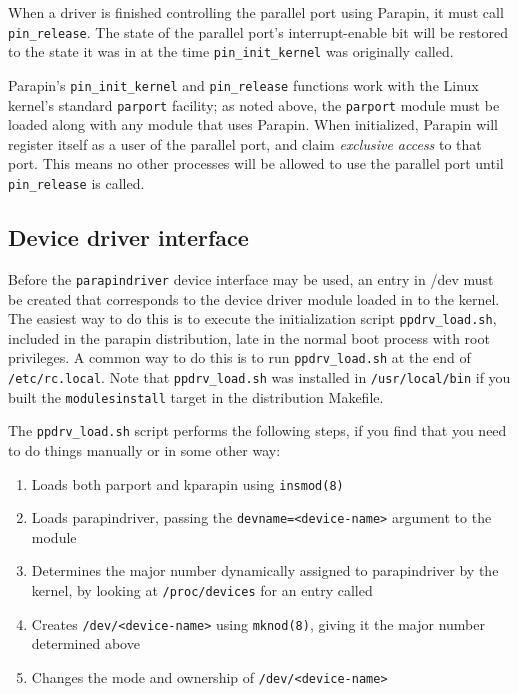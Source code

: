 \documentclass{article}
\begin{document}
When a driver is finished controlling the parallel port using Parapin,
it must call {\tt pin\_release}.  The state of the parallel port's
interrupt-enable bit will be restored to the state it was in at the
time {\tt pin\_init\_kernel} was originally called.

Parapin's {\tt pin\_init\_kernel} and {\tt pin\_release} functions
work with the Linux kernel's standard {\tt parport} facility; as noted
above, the {\tt parport} module must be loaded along with any module
that uses Parapin.  When initialized, Parapin will register itself as
a user of the parallel port, and claim {\em exclusive access} to that
port.  This means no other processes will be allowed to use the
parallel port until {\tt pin\_release} is called.

\subsection{Device driver interface}

Before the {\tt parapindriver} device interface may be used, an
entry in /dev must be created that corresponds to the device driver
module loaded in to the kernel.  The easiest way to do this is to
execute the initialization script {\tt ppdrv\_load.sh}, included in
the parapin distribution, late in the normal
boot process with root privileges.
A common way to do this is to run {\tt ppdrv\_load.sh} at the end of
{\tt /etc/rc.local}.  Note that {\tt ppdrv\_load.sh} was
installed in {\tt /usr/local/bin} if you built the {\tt modulesinstall}
target in the distribution Makefile.

The {\tt ppdrv\_load.sh} script performs the following steps, if you
find that you need to do things manually or in some other way:

\begin{enumerate}
\item Loads both parport and kparapin using {\tt insmod(8)}
\item Loads parapindriver, passing the {\tt devname=<device-name>}
argument to the module
\item Determines the major number dynamically assigned to parapindriver
by the kernel, by looking at {\tt /proc/devices} for 
an entry called {\tt <device-name>}
\item Creates {\tt /dev/<device-name>} using {\tt mknod(8)}, giving it the
major number determined above
\item Changes the mode and ownership of {\tt /dev/<device-name>}
\end{enumerate}
\end{document}
